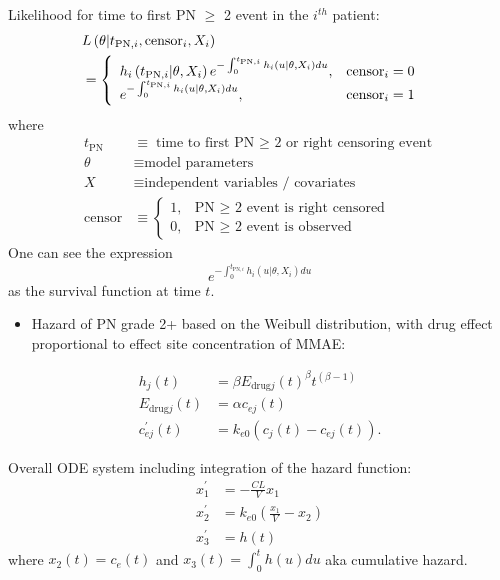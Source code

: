 \documentclass[11pt]{article}
\begin{document}
Likelihood for time to first PN \(\ge\) 2 event in the \(i^{th}\) patient:
\begin{align*}
\lefteqn{L\left(\theta | t_{\text{PN},i}, \text{censor}_i, X_i\right)} \\
  &= \left\{ \begin{array}{ll}
     h_i\left(t_{\text{PN},i} | \theta, X_i\right) e^{-\int_0^{t_{\text{PN},i}} h_i\left(u | \theta, X_i\right) du}, &
    \text{censor}_i = 0 \\
     e^{-\int_0^{t_{\text{PN},i}} h_i\left(u | \theta, X_i\right) du}, &
     \text{censor}_i = 1
\end{array} \right.
\end{align*}
where
 \begin{align*}
   t_{\text{PN}} &\equiv \text{time to first PN $\ge$ 2 or right
     censoring event} \\
 \theta &\equiv \text{model parameters} \\
 X &\equiv \text{independent variables / covariates} \\
 \text{censor} &\equiv \left\{ \begin{array}{ll}
     1, & \text{PN $\ge$ 2 event is right censored} \\
     0, & \text{PN $\ge$ 2 event is observed} 
 \end{array} \right.
\end{align*}
One can see the expression
\begin{equation*}
  e^{-\int_0^{t_{\text{PN},i}} h_i\left(u | \theta, X_i\right) du}
\end{equation*}
as the survival function at time \(t\).

\begin{itemize}
\item Hazard of PN grade 2+ based on the Weibull distribution,
with drug effect proportional to effect site concentration of MMAE:
\end{itemize}
\begin{align*}
  h_j(t) &= \beta E_{\text{drug}j}(t)^\beta t^{(\beta - 1)} \\
  E_{\text{drug}j}(t) &= \alpha c_{ej}(t) \\
  c^\prime_{ej}(t) &= k_{e0} \left(c_j(t) - c_{ej}(t)\right).
\end{align*}

Overall ODE system including integration of the hazard function:
\begin{align*}
  x_1^\prime &= -\frac{CL}{V} x_1 \\
  x_2^\prime &= k_{e0} \left(\frac{x_1}{V} - x_2\right) \\
  x_3^\prime &= h(t)
  \end{align*}
where \(x_2(t) = c_e(t)\) and \(x_3(t) = \int_0^t h(u) du\) aka cumulative hazard.
\end{document}

